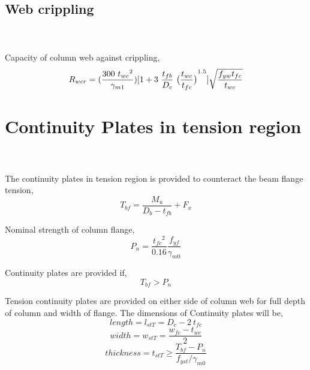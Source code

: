 \documentclass[11.5pt,a4paper,oneside]{report}
\begin{document}
\begin{Form}
\subsection{Web crippling}
\qquad {} \\ \\
\noindent
Capacity of column web against crippling,
\begin{equation}
	R_{wcr} = (\frac{300~ {t_{wc}}^2}{\gamma_{m1}})
	[1+3~\frac{t_{fb}}{D_c} ~ {\big{(}\frac{t_{wc}}{t_{fc}}\big{)}}^{1.5}]
	\sqrt{\frac{f_{yw} t_{fc}}{t_{wc}}}
\end{equation}



\section{Continuity Plates in tension region}
\qquad {} \\ \\
\noindent
The continuity plates in tension region is provided to counteract the beam flange tension, 
\begin{equation}
	T_{bf} = \frac{M_u}{D_b - t_{fb}} + F_x
\end{equation}

\noindent
Nominal strength of column flange, 
\begin{equation}
	P_n = \frac{{t_{fc}}^2}{0.16} \frac{f_{yf}}{\gamma_{m0}}	
\end{equation}

\noindent
Continuity plates are provided if,
\begin{equation}
	T_{bf} >  P_n
\end{equation}

\noindent
Tension continuity plates are provided on either side of column web for full depth of column and width of flange.
The dimensions of Continuity plates will be, \\
\begin{equation}
	length = l_{stT} = D_c-2~t_{fc}
\end{equation}
\begin{equation}
	width = w_{stT} = \frac{w_{fc}-t_{wc}}{2}
\end{equation}
\begin{equation}
	thickness = t_{stT} \ge \frac{T_{bf}-P_n}{f_{yst}/\gamma_{m0}}
\end{equation}




\end{Form}
\end{document}

